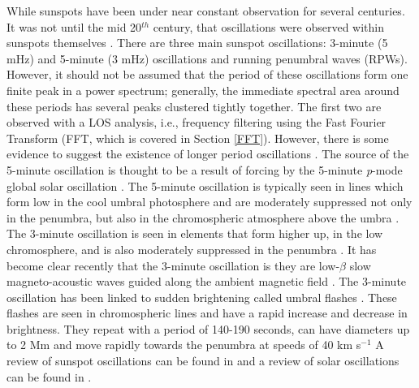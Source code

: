     While sunspots have been under near constant observation for several centuries.
    It was not until the mid 20$^{{th}}$ century, that oscillations were observed within sunspots themselves \citep{OASO}.
    There are three main sunspot oscillations: 3-minute (5 mHz) and 5-minute (3 mHz) oscillations and running penumbral waves (RPWs).
    However, it should not be assumed that the period of these oscillations form one finite peak in a power spectrum; generally, the immediate spectral area around these periods has several peaks clustered tightly together.
    The first two are observed with a LOS analysis, i.e., frequency filtering using the Fast Fourier Transform (FFT, which is covered in Section \ref{FFT}).
    However, there is some evidence to suggest the existence of longer period oscillations \citep{LPO,SOS,Chorley2011}.
    The source of the 5-minute oscillation is thought to be a result of forcing by the 5-minute \textit{p}-mode global solar oscillation \citep{OWS,WAUO}.
    The 5-minute oscillation is typically seen in lines which form low in the cool umbral photosphere and are moderately suppressed not only in the penumbra, but also in the chromospheric atmosphere above the umbra \citep{OASO}.
    The 3-minute oscillation is seen in elements that form higher up, in the low chromosphere, and is also moderately suppressed in the penumbra \citep{OASO}.
    It has become clear recently that the 3-minute oscillation is they are low-$\beta$ slow magneto-acoustic waves guided along the ambient magnetic field \citep{UTMO,OWS,ORWS}.
	The 3-minute oscillation has been linked to sudden brightening called umbral flashes \citep{1969SoPh....7..351B}.
	These flashes are seen in chromospheric lines and have a rapid increase and decrease in brightness.
	They repeat with a period of 140-190 seconds, can have diameters up to 2 Mm and move rapidly towards the penumbra at speeds of 40 km s$^{-1}$ \citep{2003A&A...403..277R}
    A review of sunspot oscillations can be found in \cite{OASO} and a review of solar oscillations can be found in \cite{SO}.
    
